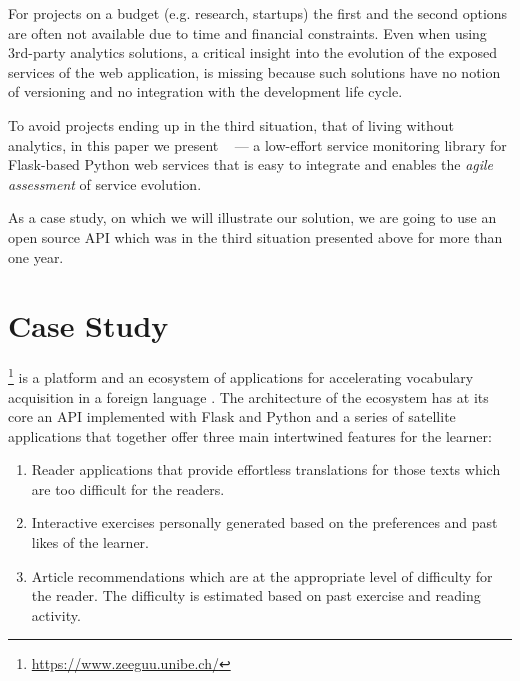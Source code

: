 \documentclass{sig-alternate-05-2015}
\begin{document}
For projects on a budget (e.g. research, startups) the first and the second options are often not available due to time and financial constraints. Even when using 3rd-party analytics solutions, a critical insight into the evolution of the exposed services of the web application, is missing because such solutions have no notion of versioning and no integration with the development life cycle.~\cite{papazoglou2011managing}

To avoid projects ending up in the third situation, that of living without analytics, in this paper we present \tool~ --- a low-effort service monitoring library for Flask-based Python web services that is easy to integrate and enables the {\em agile assessment} of service evolution. \cite{Nier12b}

As a case study, on which we will illustrate our solution, we are going to use an open source API which was in the third situation presented above for more than one year.



\section{Case Study}
\label{sec:case}


  \zee\footnote{\url{https://www.zeeguu.unibe.ch/}} is a platform and an ecosystem of applications for accelerating vocabulary acquisition in a foreign language \cite{Lungu16}. 
%
  The architecture of the ecosystem has at its core an API implemented with Flask and Python and a series of satellite applications that together offer three main intertwined features for the learner:

  \begin{enumerate}

    \item Reader applications that provide effortless translations for those texts which are too difficult for the readers.

    \item Interactive exercises personally generated based on the preferences and past likes of the learner.

    \item Article recommendations which are at the appropriate level of difficulty for the reader. The difficulty is estimated based on past exercise and reading activity.

  \end{enumerate}
\end{document}
